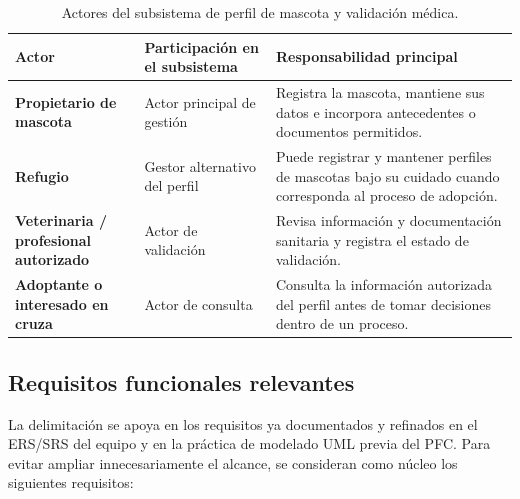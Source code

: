 \documentclass[journal,onecolumn]{IEEEtran}
\begin{document}
	\begin{table}[H]
		\caption{Actores del subsistema de perfil de mascota y validación médica.}
		\label{tab:actores}
		\centering
		\begin{tabularx}{\linewidth}{|L{3.2cm}|L{3cm}|X|}
			\hline
			\textbf{Actor} & \textbf{Participación en el subsistema} & \textbf{Responsabilidad principal} \\
			\hline
			\textbf{Propietario de mascota} & Actor principal de gestión & Registra la mascota, mantiene sus datos e incorpora antecedentes o documentos permitidos. \\
			\hline
			\textbf{Refugio} & Gestor alternativo del perfil & Puede registrar y mantener perfiles de mascotas bajo su cuidado cuando corresponda al proceso de adopción. \\
			\hline
			\textbf{Veterinaria / profesional autorizado} & Actor de validación & Revisa información y documentación sanitaria y registra el estado de validación. \\
			\hline
			\textbf{Adoptante o interesado en cruza} & Actor de consulta & Consulta la información autorizada del perfil antes de tomar decisiones dentro de un proceso. \\
			\hline
		\end{tabularx}
	\end{table}
	
	\subsection{Requisitos funcionales relevantes}
	
	La delimitación se apoya en los requisitos ya documentados y refinados en el ERS/SRS del equipo y en la práctica de modelado UML previa del PFC. Para evitar ampliar innecesariamente el alcance, se consideran como núcleo los siguientes requisitos:
	
\end{document}
